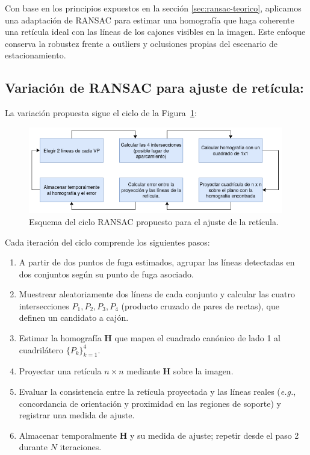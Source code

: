 
Con base en los principios expuestos en la sección \ref{sec:ransac-teorico},
aplicamos una adaptación de RANSAC para estimar una homografía que haga coherente una retícula ideal con
las líneas de los cajones visibles en la imagen. Este enfoque conserva la robustez frente a outliers y
oclusiones propias del escenario de estacionamiento.

\subsection{Variación de RANSAC para ajuste de retícula:}

La variación propuesta sigue el ciclo de la Figura~\ref{fig:ramsac-flujo}:

\begin{figure}[!ht]
    \centering
    \includegraphics[width=0.99\textwidth]{img/3-metodo/ramsac-loop1.png}
    \caption{Esquema del ciclo RANSAC propuesto para el ajuste de la retícula.}
    \label{fig:ramsac-flujo}
\end{figure}


Cada iteración del ciclo comprende los siguientes pasos:
\begin{enumerate}
    \item A partir de dos puntos de fuga estimados, agrupar las líneas detectadas en dos conjuntos según su punto de fuga asociado.
    \item Muestrear aleatoriamente dos líneas de cada conjunto y calcular las cuatro intersecciones \(P_1, P_2, P_3, P_4\) (producto cruzado de pares de rectas), que definen un candidato a cajón.
    \item Estimar la homografía \(\mathbf{H}\) que mapea el cuadrado canónico de lado 1 al cuadrilátero \(\{P_k\}_{k=1}^4\).
    \item Proyectar una retícula \(n\times n\) mediante \(\mathbf{H}\) sobre la imagen.
    \item Evaluar la consistencia entre la retícula proyectada y las líneas reales (\emph{e.g.}, concordancia de orientación y proximidad en las regiones de soporte) y registrar una medida de ajuste.
    \item Almacenar temporalmente \(\mathbf{H}\) y su medida de ajuste; repetir desde el paso 2 durante \(N\) iteraciones.
\end{enumerate}


